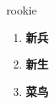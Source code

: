 
\begin{frame}
{\huge rookie}
\begin{center}
\begin{enumerate}\Large
  \item \textbf{新兵}
  \item \textbf{新生}
  \item \textbf{菜鸟}
\end{enumerate}
\end{center}
\end{frame}

